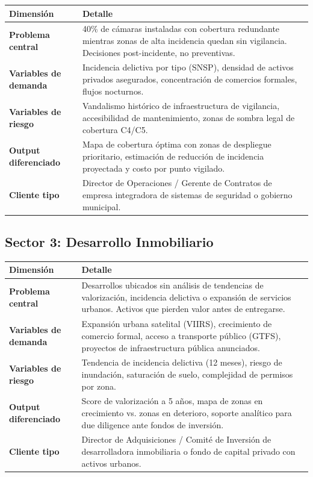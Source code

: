 \documentclass[12pt,a4paper]{article}
\begin{document}
\begin{table}[H]
\centering
\small
\renewcommand{\arraystretch}{1.3}
\begin{tabularx}{\textwidth}{>{\bfseries}l X}
\toprule
\rowcolor{grisoscuro}
\color{white}\textbf{Dimensión} & \color{white}\textbf{Detalle} \\
\midrule
Problema central & 40\% de cámaras instaladas con cobertura redundante mientras zonas de alta incidencia quedan sin vigilancia. Decisiones post-incidente, no preventivas. \\
\rowcolor{fondofila}
Variables de demanda & Incidencia delictiva por tipo (SNSP), densidad de activos privados asegurados, concentración de comercios formales, flujos nocturnos. \\
Variables de riesgo & Vandalismo histórico de infraestructura de vigilancia, accesibilidad de mantenimiento, zonas de sombra legal de cobertura C4/C5. \\
\rowcolor{fondofila}
Output diferenciado & Mapa de cobertura óptima con zonas de despliegue prioritario, estimación de reducción de incidencia proyectada y costo por punto vigilado. \\
Cliente tipo & Director de Operaciones / Gerente de Contratos de empresa integradora de sistemas de seguridad o gobierno municipal. \\
\bottomrule
\end{tabularx}
\end{table}

\subsection{Sector 3: Desarrollo Inmobiliario}

\begin{table}[H]
\centering
\small
\renewcommand{\arraystretch}{1.3}
\begin{tabularx}{\textwidth}{>{\bfseries}l X}
\toprule
\rowcolor{grisoscuro}
\color{white}\textbf{Dimensión} & \color{white}\textbf{Detalle} \\
\midrule
Problema central & Desarrollos ubicados sin análisis de tendencias de valorización, incidencia delictiva o expansión de servicios urbanos. Activos que pierden valor antes de entregarse. \\
\rowcolor{fondofila}
Variables de demanda & Expansión urbana satelital (VIIRS), crecimiento de comercio formal, acceso a transporte público (GTFS), proyectos de infraestructura pública anunciados. \\
Variables de riesgo & Tendencia de incidencia delictiva (12 meses), riesgo de inundación, saturación de suelo, complejidad de permisos por zona. \\
\rowcolor{fondofila}
Output diferenciado & Score de valorización a 5 años, mapa de zonas en crecimiento vs. zonas en deterioro, soporte analítico para due diligence ante fondos de inversión. \\
Cliente tipo & Director de Adquisiciones / Comité de Inversión de desarrolladora inmobiliaria o fondo de capital privado con activos urbanos. \\
\bottomrule
\end{tabularx}
\end{table}
\end{document}
